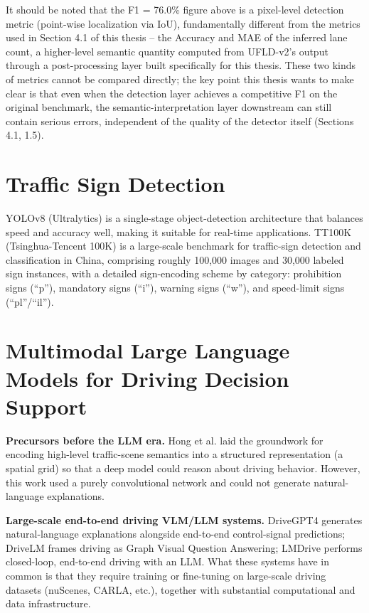 \documentclass[12pt,a4paper]{report}
\begin{document}
It should be noted that the F1 = 76.0\% figure above is a pixel-level detection metric (point-wise localization via IoU), fundamentally different from the metrics used in Section 4.1 of this thesis -- the Accuracy and MAE of the inferred lane count, a higher-level semantic quantity computed from UFLD-v2's output through a post-processing layer built specifically for this thesis. These two kinds of metrics cannot be compared directly; the key point this thesis wants to make clear is that even when the detection layer achieves a competitive F1 on the original benchmark, the semantic-interpretation layer downstream can still contain serious errors, independent of the quality of the detector itself (Sections 4.1, 1.5).

\section{Traffic Sign Detection}

YOLOv8 (Ultralytics) is a single-stage object-detection architecture that balances speed and accuracy well, making it suitable for real-time applications. TT100K (Tsinghua-Tencent 100K) \cite{zhu2016tt100k} is a large-scale benchmark for traffic-sign detection and classification in China, comprising roughly 100,000 images and 30,000 labeled sign instances, with a detailed sign-encoding scheme by category: prohibition signs (``p''), mandatory signs (``i''), warning signs (``w''), and speed-limit signs (``pl''/``il'').

\section{Multimodal Large Language Models for Driving Decision Support}

\textbf{Precursors before the LLM era.} Hong et al. \cite{hong2019rules} laid the groundwork for encoding high-level traffic-scene semantics into a structured representation (a spatial grid) so that a deep model could reason about driving behavior. However, this work used a purely convolutional network and could not generate natural-language explanations.

\textbf{Large-scale end-to-end driving VLM/LLM systems.} DriveGPT4 \cite{xu2024drivegpt4} generates natural-language explanations alongside end-to-end control-signal predictions; DriveLM \cite{sima2024drivelm} frames driving as Graph Visual Question Answering; LMDrive \cite{shao2024lmdrive} performs closed-loop, end-to-end driving with an LLM. What these systems have in common is that they require training or fine-tuning on large-scale driving datasets (nuScenes, CARLA, etc.), together with substantial computational and data infrastructure.
\end{document}
